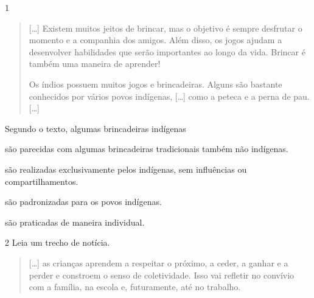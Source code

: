\num{1}
\begin{quote}
  {[}\ldots{}{]} Existem muitos jeitos de brincar, mas o objetivo é sempre desfrutar o
  momento e a companhia dos amigos. Além disso, os jogos ajudam a
  desenvolver habilidades que serão importantes ao longo da vida.
  Brincar é também uma maneira de aprender!

Os índios possuem muitos jogos e brincadeiras. Alguns são bastante
conhecidos por vários povos indígenas, {[}\ldots{}{]} como a peteca e a perna
de pau. {[}\ldots{}{]}

\end{quote}

\noindent{}Segundo o texto, algumas brincadeiras indígenas

\begin{escolha}
\item são parecidas com algumas brincadeiras tradicionais também não indígenas.

\item são realizadas exclusivamente pelos indígenas, sem influências ou compartilhamentos.

\item são padronizadas para os povos indígenas.

\item são praticadas de maneira individual.
\end{escolha}



\num{2} Leia um trecho de notícia.
\begin{quote}
  {[}\ldots{}{]} as crianças aprendem a respeitar o próximo, a ceder, a
  ganhar e a perder e constroem o senso de coletividade. Isso vai
  refletir no convívio com a família, na escola e, futuramente, até no
  trabalho.

\end{quote}

